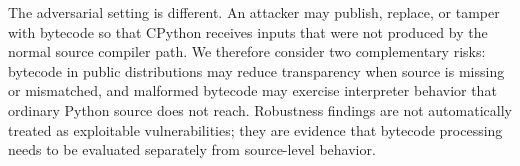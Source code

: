 The adversarial setting is different.  An attacker may publish, replace, or tamper with bytecode so that CPython receives inputs that were not produced by the normal source compiler path.  We therefore consider two complementary risks: bytecode in public distributions may reduce transparency when source is missing or mismatched, and malformed bytecode may exercise interpreter behavior that ordinary Python source does not reach.  Robustness findings are not automatically treated as exploitable vulnerabilities; they are evidence that bytecode processing needs to be evaluated separately from source-level behavior.
